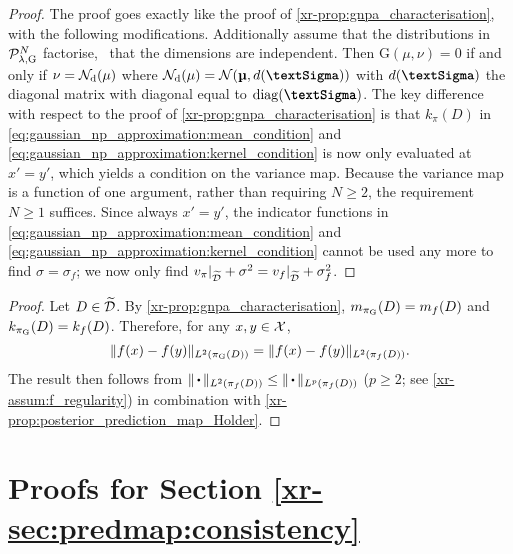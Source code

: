 \documentclass[12pt, twoside]{report}
\newcommand{\xrprefix}[1]{xr-#1}
\begin{document}
\begin{proof}
    The proof goes exactly like the proof of \cref{\xrprefix{prop:gnpa_characterisation}}, with the following modifications.
    Additionally assume that the distributions in $\Pc\ss{$\lambda$,G}^N$ factorise, \ie~that the dimensions are independent.
    Then $\text{G}(\mu, \nu) = 0$ if and only if $\nu = \mathcal{N}\ss{d}(\mu)$
    where $\Nc\ss{d}(\mu) = \Nc(\vmu, d(\mSigma))$ with $d(\mSigma)$ the diagonal matrix with diagonal equal to $\diag(\mSigma)$.
    The key difference with respect to the proof of \cref{\xrprefix{prop:gnpa_characterisation}} is that $k_\pi(D)$ in \eqref{eq:gaussian_np_approximation:mean_condition} and \eqref{eq:gaussian_np_approximation:kernel_condition} is now only evaluated at $x' = y'$, which yields a condition on the variance map.
    Because the variance map is a function of one argument,
    rather than requiring $N \ge 2$, the requirement $N \ge 1$ suffices.
    Since always $x' = y'$,
    the indicator functions in \eqref{eq:gaussian_np_approximation:mean_condition} and \eqref{eq:gaussian_np_approximation:kernel_condition} cannot be used any more to find $\sigma = \sigma_f$;
    we now only find $v_\pi|_{\widetilde{\mathcal{D}}} + \sigma^2 = v_f|_{\widetilde{\mathcal{D}}} + \sigma_f^2$.
\end{proof}

\begingroup
    \newcommand{\possibleprefix}[1]{\xrprefix{#1}}
\endgroup
\begin{proof}
    Let $D \in \widetilde{\mathcal{D}}$.
    By \cref{\xrprefix{prop:gnpa_characterisation}}, $m_{\pi\ss{G}}(D) = m_f(D)$ and $k_{\pi\ss{G}}(D) = k_f(D)$.
    Therefore, for any $x, y \in \mathcal{X}$,
    \begin{equation}
        \norm{f(x) - f(y)}_{L^2(\pi\ss{G}(D))}
        = \norm{f(x) - f(y)}_{L^2(\pi_f(D))}.
    \end{equation}
    The result then follows from $\norm{\vardot}_{L^2(\pi_f(D))} \le \norm{\vardot}_{L^p(\pi_f(D))}$ ($p \ge 2$; see \cref{\xrprefix{assum:f_regularity}}) in combination with \cref{\xrprefix{prop:posterior_prediction_map_Holder}}.
\end{proof}


\section{Proofs for Section \ref{\xrprefix{sec:predmap:consistency}}}
\label{sec:proofs_predmap:consistency}
\end{document}
